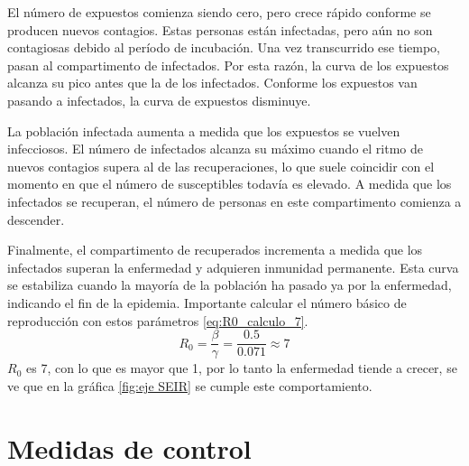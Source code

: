 El número de expuestos comienza siendo cero, pero crece rápido conforme se producen nuevos contagios. Estas personas están infectadas, pero aún no son contagiosas debido al período de incubación. Una vez transcurrido ese tiempo, pasan al compartimento de infectados. Por esta razón, la curva de los expuestos alcanza su pico antes que la de los infectados. Conforme los expuestos van pasando a infectados, la curva de expuestos disminuye.

La población infectada aumenta a medida que los expuestos se vuelven infecciosos. El número de infectados alcanza su máximo cuando el ritmo de nuevos contagios supera al de las recuperaciones, lo que suele coincidir con el momento en que el número de susceptibles todavía es elevado. A medida que los infectados se recuperan, el número de personas en este compartimento comienza a descender.

Finalmente, el compartimento de recuperados incrementa a medida que los infectados superan la enfermedad y adquieren inmunidad permanente. Esta curva se estabiliza cuando la mayoría de la población ha pasado ya por la enfermedad, indicando el fin de la epidemia.
Importante calcular el número básico de reproducción con estos parámetros \eqref{eq:R0_calculo_7}.
\begin{equation}
R_0 = \frac{\beta}{\gamma} = \frac{0.5}{0.071} \approx 7
\label{eq:R0_calculo_7}
\end{equation}
$R_0$ es 7, con lo que es mayor que 1, por lo tanto la enfermedad tiende a crecer, se ve que en la gráfica \ref{fig:eje SEIR} se cumple este comportamiento.






\section{Medidas de control}


